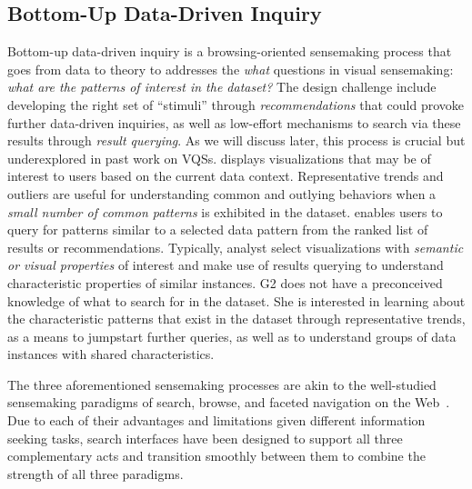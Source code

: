 {  \subsection{Bottom-Up Data-Driven Inquiry}
  Bottom-up data-driven inquiry is a browsing-oriented sensemaking process that goes from data to theory to
  addresses the \textit{what} questions in visual sensemaking: \textit{what are the patterns of interest in the dataset?} The design challenge include developing the right set of ``stimuli'' through \textit{recommendations} that could provoke further data-driven inquiries, as well as low-effort mechanisms to search via these results through \textit{result querying}. As we will discuss later, this process is crucial but underexplored in past work on VQSs.
   displays visualizations that may be of interest to users based on the current data context. Representative trends and outliers are useful for understanding common and outlying behaviors when a \emph{small number of common patterns} is exhibited in the dataset. %
   enables users to query for patterns similar to a selected data pattern from the ranked list of results or recommendations. Typically, analyst select visualizations with \emph{semantic or visual properties} of interest and make use of results querying to understand characteristic properties of similar instances.
   G2 does not have a preconceived knowledge of what to search for in the dataset. She is interested in learning about the characteristic patterns that exist in the dataset through representative trends, as a means to jumpstart further queries, as well as to understand groups of data instances with shared characteristics.
  \par The three aforementioned sensemaking processes are akin to the well-studied sensemaking paradigms of search, browse, and faceted navigation on the Web~\cite{Hearst2009,Olston2003}. Due to each of their advantages and limitations given different information seeking tasks, search interfaces have been designed to support all three complementary acts and transition smoothly between them to combine the strength of all three paradigms. 
  }
